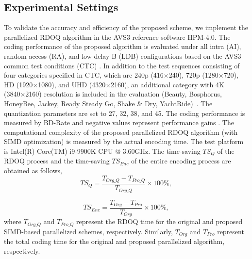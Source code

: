 \documentclass[lettersize,journal]{IEEEtran}
\begin{document}
\subsection{Experimental Settings} 
To validate the accuracy and efficiency of the proposed scheme, we implement the parallelized RDOQ algorithm in the AVS3 reference software HPM-4.0. The coding performance of the proposed algorithm is evaluated under all intra (AI), random access (RA), and low delay B (LDB) configurations based on the AVS3 common test conditions (CTC) \cite{AVS3CTC}. 
In addition to the test sequences consisting of four categories specified in CTC, which are 240p (416×240), 720p (1280×720), HD (1920×1080), and UHD (4320×2160), an additional category with 4K (3840×2160) resolution is included in the evaluation (Beauty, Bosphorus, HoneyBee, Jackey, Ready Steady Go, Shake \& Dry, YachtRide)~\cite{UVG}. 
The quantization parameters are set to 27, 32, 38, and 45. The coding performance is measured by BD-Rate and negative values represent performance gains \cite{bjontegaard2001calculationofPSNR}. The computational complexity of the proposed parallelized RDOQ algorithm (with SIMD optimization) is measured by the actual encoding time. The test platform is Intel(R) Core(TM) i9-9900K CPU @ 3.60GHz. The time-saving $TS_{Q}$ of the RDOQ process and the time-saving $TS_{Enc}$ of the entire encoding process are obtained as follows, 
\begin{equation}
	\label{TSQ}
    TS_{Q} = \frac{T_{Org\_Q}-T_{Pro\_Q}}{T_{Org\_Q}} \times 100\%,
\end{equation}

\begin{equation}
	\label{TSEnc}
	TS_{Enc} = \frac{T_{Org}-T_{Pro}}{T_{Org}} \times 100\%,
\end{equation}
where $T_{Org\_Q}$ and $T_{Pro\_Q}$ represent the RDOQ time for the original and proposed SIMD-based parallelized schemes, respectively. Similarly, $T_{Org}$ and $T_{Pro}$ represent the total coding time for the original and proposed parallelized algorithm, respectively. 
\end{document}

